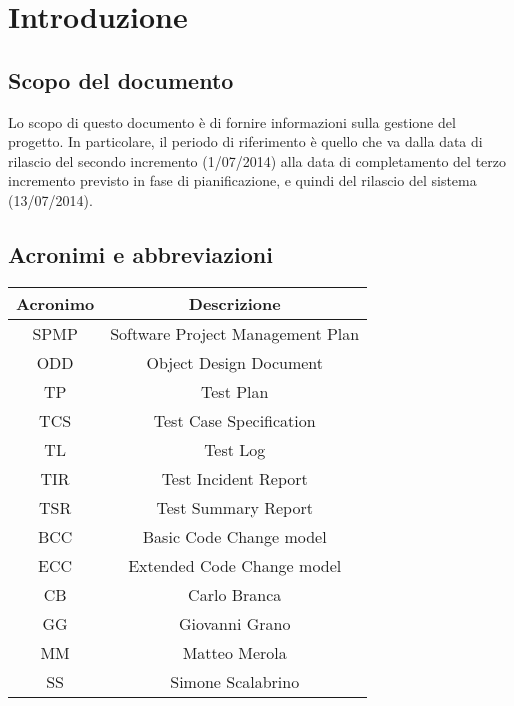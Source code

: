 \chapter{Introduzione}
\section{Scopo del documento}
Lo scopo di questo documento è di fornire informazioni sulla gestione del progetto. In particolare, il periodo di riferimento è quello che va dalla data di rilascio del secondo incremento (1/07/2014) alla data di completamento del terzo incremento previsto in fase di pianificazione, e quindi del rilascio del sistema (13/07/2014).

\section{Acronimi e abbreviazioni}
\begin{table}[ht]
\centering
\begin{tabular}{|c|c|}
 \hline
 \rowcolor{Gray}\textbf{Acronimo}			& \textbf{Descrizione}				\\
 \hline
 SPMP							& Software Project Management Plan		\\
 \hline
 ODD							& Object Design Document			\\
 \hline
 TP							& Test Plan					\\
 \hline
 TCS							& Test Case Specification			\\
 \hline
 TL							& Test Log					\\
 \hline
 TIR							& Test Incident Report				\\
 \hline
 TSR							& Test Summary Report				\\
 \hline
 BCC							& Basic Code Change model			\\
 \hline
 ECC							& Extended Code Change model			\\
 \hline
 CB							& Carlo Branca					\\
 \hline
 GG							& Giovanni Grano				\\
 \hline
 MM							& Matteo Merola					\\
 \hline
 SS							& Simone Scalabrino				\\
 \hline
\end{tabular}
\end{table}